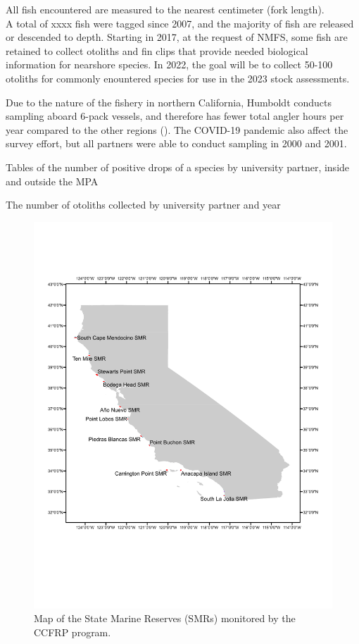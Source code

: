 \documentclass[
]{article}
\begin{document}
All fish encountered are measured to the nearest centimeter (fork length).\\
A total of xxxx fish were tagged since 2007, and the majority of fish are
released or descended to depth. Starting in 2017, at the request of NMFS, some
fish are retained to collect otoliths and fin clips that provide needed
biological information for nearshore species. In 2022, the goal will be to collect
50-100 otoliths for commonly enountered species for use in the 2023 stock assessments.

Due to the nature of the fishery in northern California, Humboldt conducts sampling aboard 6-pack
vessels, and therefore has fewer total angler hours per year compared to the
other regions (). The COVID-19 pandemic also affect the survey effort, but all
partners were able to conduct sampling in 2000 and 2001.

Tables of the number of positive drops of a species by university partner,
inside and outside the MPA

The number of otoliths collected by university partner and year

\begin{figure}
\centering
\includegraphics{MPA_map.pdf}
\caption{\label{fig:fig-mpa-map}Map of the State Marine Reserves (SMRs) monitored by the CCFRP program.}
\end{figure}
\end{document}
